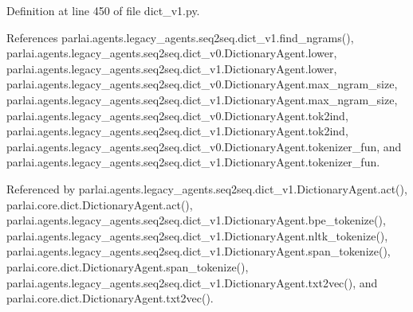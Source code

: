 Definition at line 450 of file dict\+\_\+v1.\+py.



References parlai.\+agents.\+legacy\+\_\+agents.\+seq2seq.\+dict\+\_\+v1.\+find\+\_\+ngrams(), parlai.\+agents.\+legacy\+\_\+agents.\+seq2seq.\+dict\+\_\+v0.\+Dictionary\+Agent.\+lower, parlai.\+agents.\+legacy\+\_\+agents.\+seq2seq.\+dict\+\_\+v1.\+Dictionary\+Agent.\+lower, parlai.\+agents.\+legacy\+\_\+agents.\+seq2seq.\+dict\+\_\+v0.\+Dictionary\+Agent.\+max\+\_\+ngram\+\_\+size, parlai.\+agents.\+legacy\+\_\+agents.\+seq2seq.\+dict\+\_\+v1.\+Dictionary\+Agent.\+max\+\_\+ngram\+\_\+size, parlai.\+agents.\+legacy\+\_\+agents.\+seq2seq.\+dict\+\_\+v0.\+Dictionary\+Agent.\+tok2ind, parlai.\+agents.\+legacy\+\_\+agents.\+seq2seq.\+dict\+\_\+v1.\+Dictionary\+Agent.\+tok2ind, parlai.\+agents.\+legacy\+\_\+agents.\+seq2seq.\+dict\+\_\+v0.\+Dictionary\+Agent.\+tokenizer\+\_\+fun, and parlai.\+agents.\+legacy\+\_\+agents.\+seq2seq.\+dict\+\_\+v1.\+Dictionary\+Agent.\+tokenizer\+\_\+fun.



Referenced by parlai.\+agents.\+legacy\+\_\+agents.\+seq2seq.\+dict\+\_\+v1.\+Dictionary\+Agent.\+act(), parlai.\+core.\+dict.\+Dictionary\+Agent.\+act(), parlai.\+agents.\+legacy\+\_\+agents.\+seq2seq.\+dict\+\_\+v1.\+Dictionary\+Agent.\+bpe\+\_\+tokenize(), parlai.\+agents.\+legacy\+\_\+agents.\+seq2seq.\+dict\+\_\+v1.\+Dictionary\+Agent.\+nltk\+\_\+tokenize(), parlai.\+agents.\+legacy\+\_\+agents.\+seq2seq.\+dict\+\_\+v1.\+Dictionary\+Agent.\+span\+\_\+tokenize(), parlai.\+core.\+dict.\+Dictionary\+Agent.\+span\+\_\+tokenize(), parlai.\+agents.\+legacy\+\_\+agents.\+seq2seq.\+dict\+\_\+v1.\+Dictionary\+Agent.\+txt2vec(), and parlai.\+core.\+dict.\+Dictionary\+Agent.\+txt2vec().

